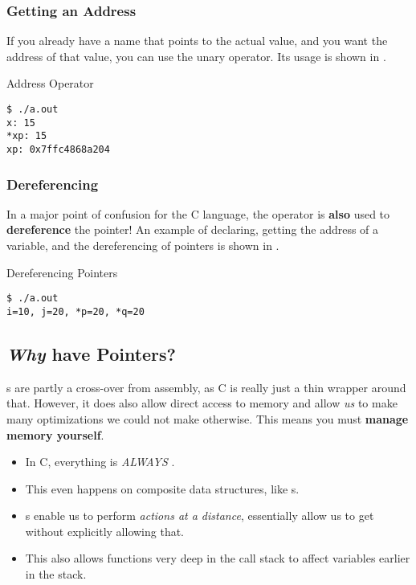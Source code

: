 \subsubsection{Getting an Address}\label{subsubsec:Getting_an_Address}
If you already have a name that points to the actual value, and you want the address of that value, you can use the \cinline{&} unary operator.
Its usage is shown in .
\begin{listing}[h!tbp]
\caption{Address \cinline{&} Operator}
\label{lst:Address_Operator}
\begin{verbatim}
$ ./a.out
x: 15
*xp: 15
xp: 0x7ffc4868a204
\end{verbatim}
\end{listing}

\subsubsection{Dereferencing}\label{subsubsec:Dereferencing_Pointers}
In a major point of confusion for the C language, the \cinline{*} operator is \textbf{also} used to \textbf{dereference} the pointer!
An example of declaring, getting the address of a variable, and the dereferencing of pointers is shown in .
\begin{listing}[h!tbp]
\caption{Dereferencing Pointers}
\label{lst:Dereferencing_Pointers}

\begin{verbatim}
$ ./a.out
i=10, j=20, *p=20, *q=20
\end{verbatim}
\end{listing}

\subsection{\emph{Why} have Pointers?}\label{subsec:Why_Have_Pointers}
s are partly a cross-over from assembly, as C is really just a thin wrapper around that.
However, it does also allow direct access to memory and allow \emph{us} to make many optimizations we could not make otherwise.
This means you must \textbf{manage memory yourself}.

\begin{itemize}
\item In C, everything is \emph{ALWAYS} .
\item This even happens on composite data structures, like s.
\item {}s enable us to perform \emph{actions at a distance}, essentially allow us to get  without explicitly allowing that.
\item This also allows functions very deep in the call stack to affect variables earlier in the stack.
\end{itemize}

